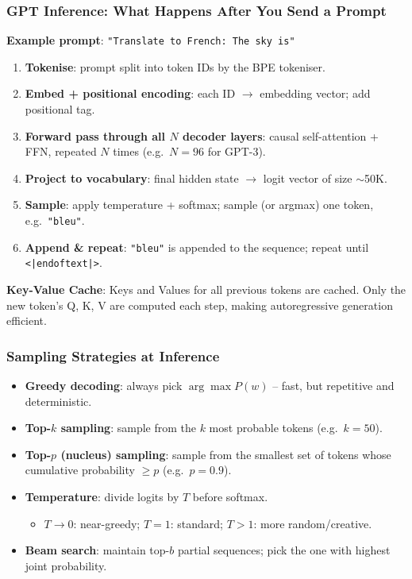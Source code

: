 \begin{frame}[fragile]\frametitle{GPT Inference: What Happens After You Send a Prompt}
\textbf{Example prompt}: \texttt{"Translate to French: The sky is"}

\begin{enumerate}
\item \textbf{Tokenise}: prompt split into token IDs by the BPE tokeniser.
\item \textbf{Embed + positional encoding}: each ID $\rightarrow$ embedding vector; add positional tag.
\item \textbf{Forward pass through all $N$ decoder layers}:
      causal self-attention + FFN, repeated $N$ times (e.g.\ $N=96$ for GPT-3).
\item \textbf{Project to vocabulary}: final hidden state $\rightarrow$ logit vector of size $\sim$50K.
\item \textbf{Sample}: apply temperature + softmax; sample (or argmax) one token, e.g.\ \texttt{"bleu"}.
\item \textbf{Append \& repeat}: \texttt{"bleu"} is appended to the sequence; repeat until \texttt{<|endoftext|>}.
\end{enumerate}
\vspace{0.3em}
\textbf{Key-Value Cache}: Keys and Values for all previous tokens are cached.  Only the new token's Q, K, V are computed each step,  making autoregressive generation efficient.
\end{frame}

\begin{frame}[fragile]\frametitle{Sampling Strategies at Inference}
\begin{itemize}
\item \textbf{Greedy decoding}: always pick $\arg\max P(w)$ – fast, but repetitive and deterministic.
\item \textbf{Top-$k$ sampling}: sample from the $k$ most probable tokens (e.g.\ $k=50$).
\item \textbf{Top-$p$ (nucleus) sampling}: sample from the smallest set of tokens whose cumulative probability $\ge p$ (e.g.\ $p=0.9$).
\item \textbf{Temperature}: divide logits by $T$ before softmax.
  \begin{itemize}
  \item $T \to 0$: near-greedy; $T=1$: standard; $T > 1$: more random/creative.
  \end{itemize}
\item \textbf{Beam search}: maintain top-$b$ partial sequences; pick the one with highest joint probability.
\end{itemize}
\end{frame}

